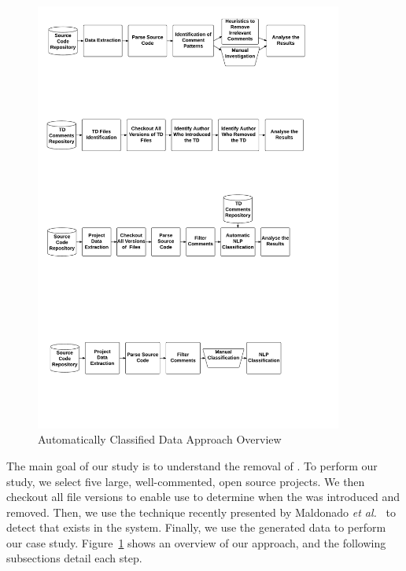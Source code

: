 
\begin{figure}[thb!]
  \centering
  \includegraphics[width=0.90\textwidth]{figures/automatically_classified_data_approach2.pdf}
  \caption{Automatically Classified Data Approach Overview}
  \label{fig:automatically_classified_data_approach_overview}
\end{figure}

The main goal of our study is to understand the removal of \SATD. To perform our study, we select five large, well-commented, open source projects. We then checkout all file versions to enable use to determine when the \SATD was introduced and removed. Then, we use the technique recently presented by Maldonado \emph{et al.}~\cite{Maldonado2015TSE} to detect \SATD that exists in the system. Finally, we use the generated data to perform our case study. Figure~\ref{fig:automatically_classified_data_approach_overview} shows an overview of our approach, and the following subsections detail each step.

